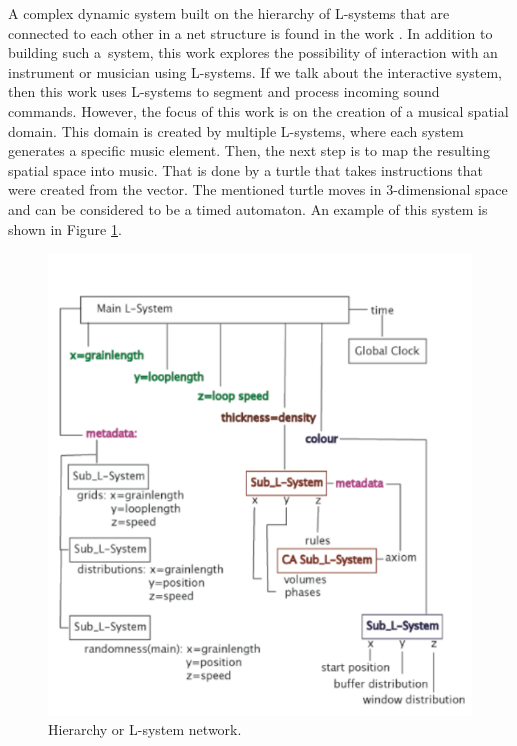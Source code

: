 A complex dynamic system built on the hierarchy of L-systems that are connected to each other in a net structure is found in the work \cite{manousakis2006musical}. In addition to building such a~system, this work explores the possibility of interaction with an instrument or musician using L-systems. If we talk about the interactive system, then this work uses L-systems to segment and process incoming sound commands. However, the focus of this work is on the creation of a musical spatial domain. This domain is created by multiple L-systems, where each system generates a specific music element. Then, the next step is to map the resulting spatial space into music. That is done by a turtle that takes instructions that were created from the vector. The mentioned turtle moves in 3-dimensional space and can be considered to be a timed automaton. An example of this system is shown in Figure \ref{fig:lsystems}.

\begin{figure}[H]
    \centering
    \includegraphics[scale=0.5]{obrazky-figures/lsystems.png}
    \caption{Hierarchy or L-system network.}
    \label{fig:lsystems}
\end{figure}

